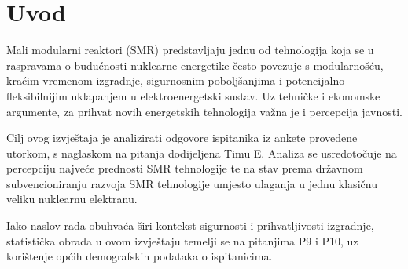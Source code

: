 \section{Uvod}

Mali modularni reaktori (SMR) predstavljaju jednu od tehnologija koja se u raspravama o budućnosti nuklearne energetike često povezuje s modularnošću, kraćim vremenom izgradnje, sigurnosnim poboljšanjima i potencijalno fleksibilnijim uklapanjem u elektroenergetski sustav. Uz tehničke i ekonomske argumente, za prihvat novih energetskih tehnologija važna je i percepcija javnosti.

Cilj ovog izvještaja je analizirati odgovore ispitanika iz ankete provedene utorkom, s naglaskom na pitanja dodijeljena Timu E. Analiza se usredotočuje na percepciju najveće prednosti SMR tehnologije te na stav prema državnom subvencioniranju razvoja SMR tehnologije umjesto ulaganja u jednu klasičnu veliku nuklearnu elektranu.

Iako naslov rada obuhvaća širi kontekst sigurnosti i prihvatljivosti izgradnje, statistička obrada u ovom izvještaju temelji se na pitanjima P9 i P10, uz korištenje općih demografskih podataka o ispitanicima.
